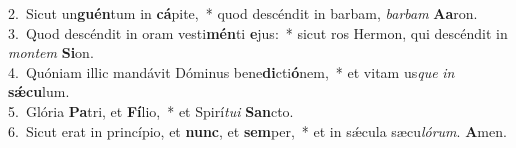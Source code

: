 {2.~}Sicut un\textbf{guén}tum in \textbf{cá}pite,~* quod descéndit in barbam, \textit{bar}\textit{bam} \textbf{A}\textbf{a}ron.\\
{3.~}Quod descéndit in oram vesti\textbf{mén}ti \textbf{e}jus:~* sicut ros Hermon, qui descéndit in \textit{mon}\textit{tem} \textbf{Si}on.\\
{4.~}Quóniam illic mandávit Dóminus bene\textbf{di}cti\textbf{ó}nem,~* et vitam us\textit{que} \textit{in} \textbf{sǽ}\textbf{cu}lum.\\
{5.~}Glória \textbf{Pa}tri, et \textbf{Fí}lio,~* et Spirí\textit{tu}\textit{i} \textbf{San}cto.\\
{6.~}Sicut erat in princípio, et \textbf{nunc}, et \textbf{sem}per,~* et in sǽcula sæcu\textit{ló}\textit{rum}. \textbf{A}men.\\
